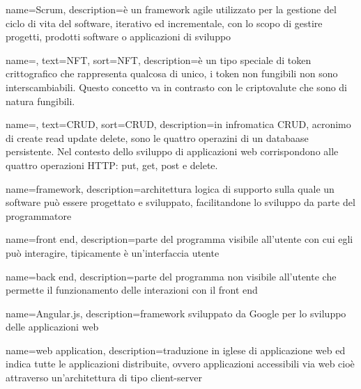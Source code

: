 {
	name={Scrum},
	description={è un framework agile utilizzato per la gestione del ciclo di vita del software, iterativo ed incrementale, con lo scopo di gestire progetti, prodotti software o applicazioni di sviluppo}
}

{
	name=,
	text=NFT,
	sort=NFT,
	description={è un tipo speciale di token crittografico che rappresenta qualcosa di unico, i token non fungibili non sono interscambiabili. Questo concetto va in contrasto con le criptovalute che sono di natura fungibili.}
}

{
	name=,
	text=CRUD,
	sort=CRUD,
	description={in infromatica CRUD, acronimo di create read update delete, sono le quattro operazini di un databaase persistente. Nel contesto dello sviluppo di applicazioni web corrispondono alle quattro operazioni HTTP: put, get, post e delete.}
}

{
	name={framework},
	description={architettura logica di supporto sulla quale un software può essere progettato e sviluppato, facilitandone lo sviluppo da parte del programmatore}
}

{
	name={front end},
	description={parte del programma visibile all'utente con cui egli può interagire, tipicamente è un'interfaccia utente}
}

{
	name={back end},
	description={parte del programma non visibile all'utente che permette il funzionamento delle interazioni con il front end}
}

{
	name={Angular.js},
	description={framework sviluppato da Google per lo sviluppo delle applicazioni web}
}

{
	name={web application},
	description={traduzione in iglese di applicazione web ed indica tutte le applicazioni distribuite, ovvero applicazioni accessibili via web cioè attraverso un'architettura di tipo client-server}
}